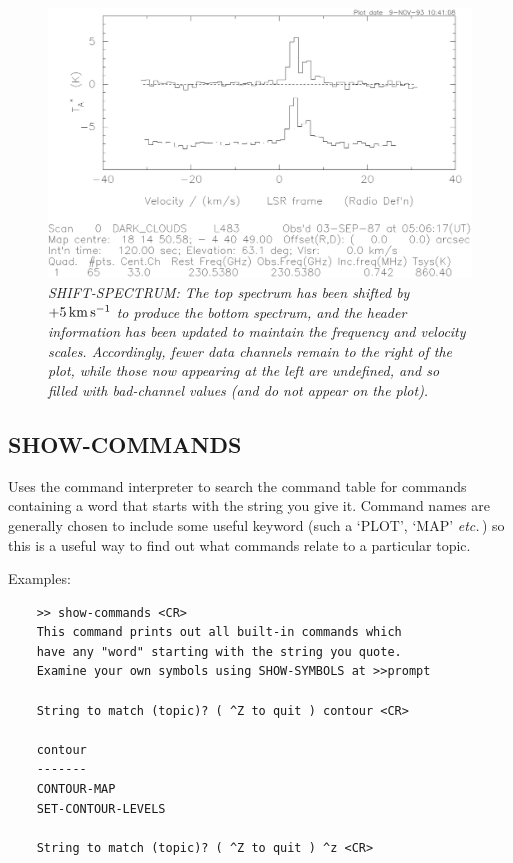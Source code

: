 \documentclass[11pt,twoside]{report}
\newcommand{\etc}{{\it etc.\,}}
\newcommand{\kms}{{\rm\,km\,s^{-1}}}
\begin{document}
\begin{figure}[htbp]
\begin{center}
\includegraphics[scale=0.65]{shift.ps}
\protect\parbox{5.5in}
{\caption[SHIFT]
{\sl
SHIFT-SPECTRUM: The top spectrum has been shifted by $+5\kms$ to produce
the bottom spectrum, and the header information has been updated to maintain
the frequency and velocity scales. Accordingly, fewer data channels remain to
the right of the plot, while those now appearing at the left are undefined, and
so filled with bad-channel values (and do not appear on the plot).
\label{SHIFT}
}
}
\end{center}
\end{figure}

\subsection{SHOW-COMMANDS} 

Uses the command interpreter to search the command table 
for commands containing a word that starts with the string you give it. Command
names are generally chosen to include some useful keyword  (such
a `PLOT', `MAP' \etc) so this is a useful way to find out what commands relate
to a particular topic.

Examples:
\begin{verbatim}
    >> show-commands <CR>
    This command prints out all built-in commands which
    have any "word" starting with the string you quote.
    Examine your own symbols using SHOW-SYMBOLS at >>prompt

    String to match (topic)? ( ^Z to quit ) contour <CR>

    contour
    -------
    CONTOUR-MAP
    SET-CONTOUR-LEVELS

    String to match (topic)? ( ^Z to quit ) ^z <CR>
\end{verbatim}
\end{document}
